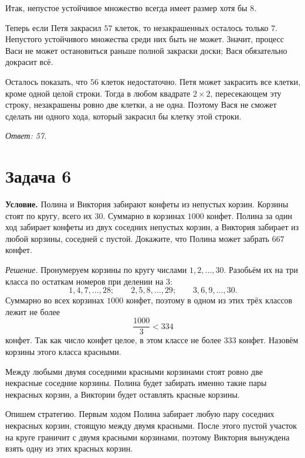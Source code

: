 Итак, непустое устойчивое множество всегда имеет размер хотя бы $8$.

Теперь если Петя закрасил $57$ клеток, то незакрашенных осталось только $7$. Непустого устойчивого множества среди них быть не может. Значит, процесс Васи не может остановиться раньше полной закраски доски; Вася обязательно докрасит всё.

Осталось показать, что $56$ клеток недостаточно. Петя может закрасить все клетки, кроме одной целой строки. Тогда в любом квадрате $2\times2$, пересекающем эту строку, незакрашены ровно две клетки, а не одна. Поэтому Вася не сможет сделать ни одного хода, который закрасил бы клетку этой строки.

\begin{center}
\end{center}

\textit{Ответ: 57.}

\section*{Задача 6}
\textbf{Условие.} Полина и Виктория забирают конфеты из непустых корзин. Корзины стоят по кругу, всего их $30$. Суммарно в корзинах $1000$ конфет. Полина за один ход забирает конфеты из двух соседних непустых корзин, а Виктория забирает из любой корзины, соседней с пустой. Докажите, что Полина может забрать $667$ конфет.

\textit{Решение.}
Пронумеруем корзины по кругу числами $1,2,\ldots,30$. Разобьём их на три класса по остаткам номеров при делении на $3$:
\[
1,4,7,\ldots,28;\qquad
2,5,8,\ldots,29;\qquad
3,6,9,\ldots,30.
\]
Суммарно во всех корзинах $1000$ конфет, поэтому в одном из этих трёх классов лежит не более
\[
\frac{1000}{3}<334
\]
конфет. Так как число конфет целое, в этом классе не более $333$ конфет. Назовём корзины этого класса красными.

Между любыми двумя соседними красными корзинами стоят ровно две некрасные соседние корзины. Полина будет забирать именно такие пары некрасных корзин, а Виктории будет оставлять красные корзины.

Опишем стратегию. Первым ходом Полина забирает любую пару соседних некрасных корзин, стоящую между двумя красными. После этого пустой участок на круге граничит с двумя красными корзинами, поэтому Виктория вынуждена взять одну из этих красных корзин.

